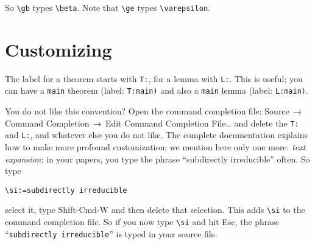 \documentclass[letterpaper,11pt]{article}
\newcommand{\cmd}[1]{\textsf{#1}}
\newcommand{\mnu}[1]{\textsf{#1}}
\newcommand{\To}{\,\(\to\)\,}
\begin{document}
\smallskip

So \verb|\gb| types \verb|\beta|. Note that \verb|\ge| types \verb|\varepsilon|.

\section{Customizing}

The label for a theorem starts with \verb|T:|, 
for a lemma with \verb|L:|. This is useful; 
you can have a \verb|main| theorem (label: \verb|T:main)|
and also a \verb|main| lemma (label: \verb|L:main)|.

You do not like this convention? Open the command completion file:
\mnu{Source}\To\mnu{Command Completion}\To\mnu{Edit Command Completion File…}
and delete the \verb|T:| and \verb|L:|, and whatever else you do not like. The complete documentation explains how to make more profound customization; we mention here only one more: \emph{text expansion}: in your papers, you type the phrase ``subdirectly irreducible'' often. So type
\begin{verbatim}
\si:=subdirectly irreducible
\end{verbatim}
select it, type Shift-Cmd-W and then delete that selection. This adds \verb|\si| to the command completion file. So if you now type \verb|\si| and hit \cmd{Esc}, the phrase ``\texttt{subdirectly irreducible}'' is typed in your source file.
\end{document}
